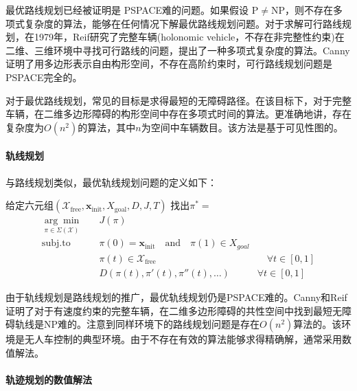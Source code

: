       最优路线规划已经被证明是 PSPACE难的问题\cite{Reif1979Complexity}。如果假设 $\mathrm{P}\neq \mathrm{NP}$，则不存在多项式复杂度的算法，能够在任何情况下解最优路线规划问题。对于求解可行路线规划，在1979年，Reif\cite{Reif1979Complexity}研究了完整车辆(holonomic vehicle，不存在非完整性约束)在二维、三维环境中寻找可行路线的问题，提出了一种多项式复杂度的算法。Canny\cite{Canny1988The}证明了用多边形表示自由构形空间，不存在高阶约束时，可行路线规划问题是PSPACE完全的。

      对于最优路线规划，常见的目标是求得最短的无障碍路径。在该目标下，对于完整车辆，在二维多边形障碍的构形空间中存在多项式时间的算法\cite{Storer1994Shortest,Lozano1979An}。更准确地讲，存在复杂度为$O(n^2)$的算法，其中$n$为空间中车辆数目。该方法是基于可见性图的。

      \paragraph{轨线规划} 与路线规划类似，最优轨线规划问题的定义如下：

      \begin{definition}[最优轨线规划]
      \label{def:trajectory}
      给定六元组$(\mathcal{X}_{\mathrm{free}}, \mathbf{x}_{\mathrm{init}}, X_{\mathrm{goal}}, D, J, T)$ 找出$\pi^*=$
      \begin{equation}
      \begin{aligned}
      \underset{\pi\in \Sigma(\mathcal{X})}{\arg\min}\quad & J(\pi) & \\
      \mathrm{subj. to} \quad & \pi(0)=\mathbf{x}_{\mathrm{init}} \quad \mathrm{and} \quad \pi(1)\in X_{goal} & \\
      \quad & \pi(t)\in \mathcal{X}_{\mathrm{free}} & \quad \forall t\in [0,1]\\
      & D(\pi(t),\pi'(t),\pi''(t), \dots) & \forall t\in [0,1]
      \end{aligned}
      \end{equation}
      \end{definition}

      由于轨线规划是路线规划的推广，最优轨线规划仍是PSPACE难的。Canny和Reif\cite{Canny1987New}证明了对于有速度约束的完整车辆，在二维多边形障碍的共性空间中找到最短无障碍轨线是NP难的。注意到同样环境下的路线规划问题是存在$O(n^2)$算法的。该环境是无人车控制的典型环境。由于不存在有效的算法能够求得精确解，通常采用数值解法。

      \paragraph{轨迹规划的数值解法}

